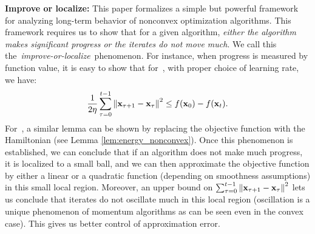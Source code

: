 
\textbf{Improve or localize:}
This paper formalizes a simple but powerful framework 
for analyzing long-term behavior of nonconvex optimization algorithms.  This framework requires us to show that for a given algorithm, \emph{either the algorithm makes significant progress or the iterates do not move much}.
We call this the~\emph{improve-or-localize}~phenomenon. For instance, when progress is measured 
by function value, it is easy to show that for~\gd, with proper choice of learning rate, we have: 
$$ \frac{1}{2\eta} \sum_{\tau=0}^{t-1} \left\|{\mathbf{x}_{\tau+1} - \mathbf{x}_\tau}\right\|^2 \le f(\mathbf{x}_0) - f(\mathbf{x}_t).$$
For~\nag, a similar lemma can be shown by replacing the objective function with the Hamiltonian 
(see Lemma \ref{lem:energy_nonconvex}).  Once this phenomenon is established, we can conclude 
that if an algorithm does not make much progress, it is localized to a small ball, and we can then 
approximate the objective function by either a linear or a quadratic function (depending on smoothness 
assumptions) in this small local region. Moreover, an upper bound on 
$\sum_{\tau=0}^{t-1} \left\|{\mathbf{x}_{\tau+1} - \mathbf{x}_\tau}\right\|^2$ lets us conclude that iterates do not 
oscillate much in this local region (oscillation is a unique phenomenon of momentum algorithms 
as can be seen even in the convex case).  This gives us better control of approximation error.

